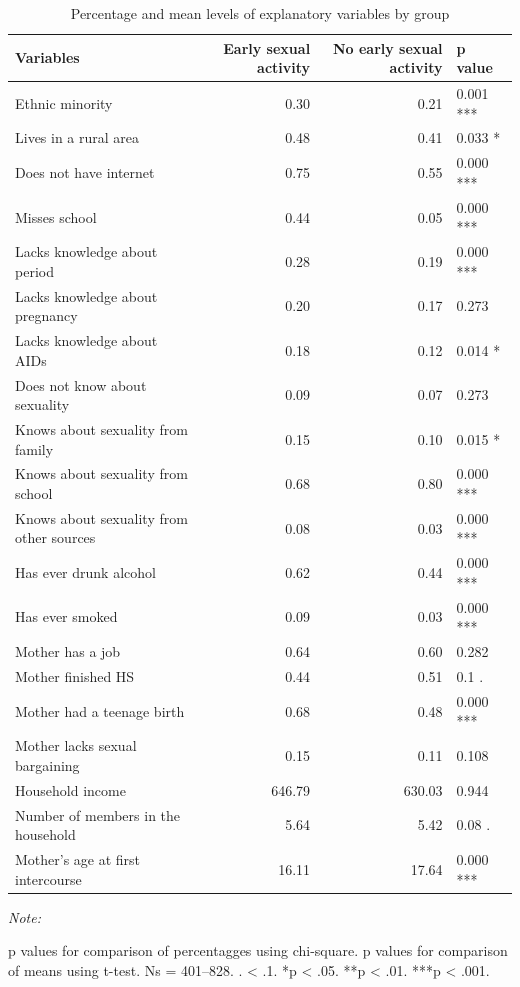 \documentclass[
]{article}
\begin{document}
\begin{table}

\caption{\label{tab:unnamed-chunk-1}Percentage and mean levels of explanatory variables by group}
\centering
\begin{threeparttable}
\begin{tabular}[t]{lrrl}
\toprule
Variables & Early sexual activity & No early sexual activity & p value\\
\midrule
Ethnic minority & 0.30 & 0.21 & 0.001 ***\\
Lives in a rural area & 0.48 & 0.41 & 0.033 *\\
Does not have internet & 0.75 & 0.55 & 0.000 ***\\
Misses school & 0.44 & 0.05 & 0.000 ***\\
Lacks knowledge about period & 0.28 & 0.19 & 0.000 ***\\
\addlinespace
Lacks knowledge about pregnancy & 0.20 & 0.17 & 0.273\\
Lacks knowledge about AIDs & 0.18 & 0.12 & 0.014 *\\
Does not know about sexuality & 0.09 & 0.07 & 0.273\\
Knows about sexuality from family & 0.15 & 0.10 & 0.015 *\\
Knows about sexuality from school & 0.68 & 0.80 & 0.000 ***\\
\addlinespace
Knows about sexuality from other sources & 0.08 & 0.03 & 0.000 ***\\
Has ever drunk alcohol & 0.62 & 0.44 & 0.000 ***\\
Has ever smoked & 0.09 & 0.03 & 0.000 ***\\
Mother has a job & 0.64 & 0.60 & 0.282\\
Mother finished HS & 0.44 & 0.51 & 0.1  .\\
\addlinespace
Mother had a teenage birth & 0.68 & 0.48 & 0.000 ***\\
Mother lacks sexual bargaining & 0.15 & 0.11 & 0.108\\
Household income & 646.79 & 630.03 & 0.944\\
Number of members in the household & 5.64 & 5.42 & 0.08  .\\
Mother's age at first intercourse & 16.11 & 17.64 & 0.000 ***\\
\bottomrule
\end{tabular}
\begin{tablenotes}[para]
\item \textit{Note: } 
\item p values for comparison of percentagges using chi-square. p values for comparison of means using t-test. Ns = 401–828. . < .1. *p < .05. **p < .01. ***p < .001.
\end{tablenotes}
\end{threeparttable}
\end{table}
\end{document}
